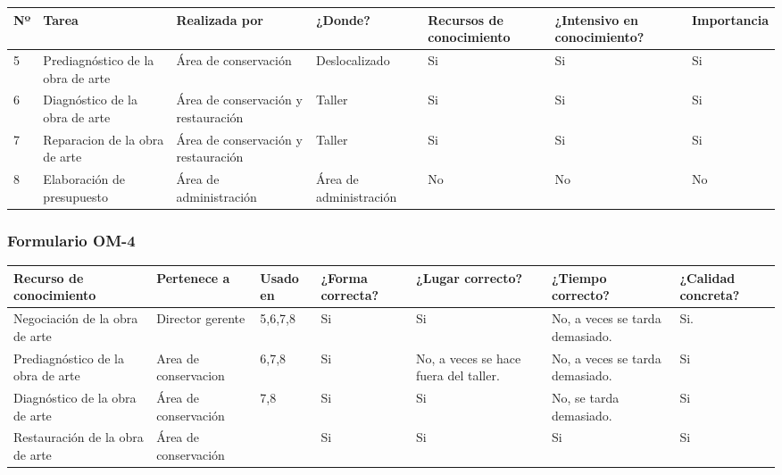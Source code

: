 \documentclass[a4paper,11pt]{article}
\begin{document}
			\newpage
			\begin{landscape}
			\begin{center}
				\begin{tabular}{| l | p{4cm} | p{2.8cm} | p{2cm} | p{2cm} | p{3cm} |
				p{2.2cm} |}
					\hline
					\cellcolor[RGB]{224,233,250}\textbf{Nº} &
					\cellcolor[RGB]{224,233,250}\textbf{Tarea} &
					\cellcolor[RGB]{224,233,250}\textbf{Realizada por} &
					\cellcolor[RGB]{224,233,250}\textbf{¿Donde?} &
					\cellcolor[RGB]{224,233,250}\textbf{Recursos de conocimiento} &
					\cellcolor[RGB]{224,233,250}\textbf{¿Intensivo en conocimiento?} &
					\cellcolor[RGB]{224,233,250}\textbf{Importancia}\\
					\hline
					5 & Prediagnóstico de la obra de arte & Área de conservación &
					Deslocalizado & Si & Si & Si\\
					\hline
					6 & Diagnóstico de la obra de arte & Área de conservación y restauración &
					Taller & Si & Si & Si\\
					\hline
					7 & Reparacion de la obra de arte & Área de conservación y restauración &
					Taller & Si & Si & Si\\
					\hline
					8 & Elaboración de presupuesto & Área de administración & Área de
					administración & No & No & No\\
					\hline
				\end{tabular}
			\end{center}
			\end{landscape}
			\newpage
			\begin{landscape}
			\subsubsection{Formulario OM-4}
			\begin{center}
				\begin{tabular}{| p{5cm} | p{2.4cm} | p{2cm} | p{2cm} | p{2cm} | p{2cm} |
				p{2cm} |}
					\hline
					\cellcolor[RGB]{224,233,250}\textbf{Recurso de conocimiento} &
					\cellcolor[RGB]{224,233,250}\textbf{Pertenece a} &
					\cellcolor[RGB]{224,233,250}\textbf{Usado en} &
					\cellcolor[RGB]{224,233,250}\textbf{¿Forma correcta?} &
					\cellcolor[RGB]{224,233,250}\textbf{¿Lugar correcto?} &
					\cellcolor[RGB]{224,233,250}\textbf{¿Tiempo correcto?} &
					\cellcolor[RGB]{224,233,250}\textbf{¿Calidad concreta?}\\
					\hline
					Negociación de la obra de arte & Director gerente & 5,6,7,8 & Si & Si & No, a
					veces se tarda demasiado. & Si.\\
					\hline
					Prediagnóstico de la obra de arte & Area de conservacion & 6,7,8 & Si & No,
					a veces se hace fuera del taller. & No, a veces se tarda demasiado. & Si\\
					\hline
					Diagnóstico de la obra de arte & Área de conservación & 7,8 & Si & Si & No,
					se tarda demasiado. & Si\\
					\hline
					Restauración de la obra de arte & Área de conservación & & Si & Si & Si & Si\\
					\hline
				\end{tabular}
			\end{center}
			\end{landscape}
			\newpage
\end{document}
